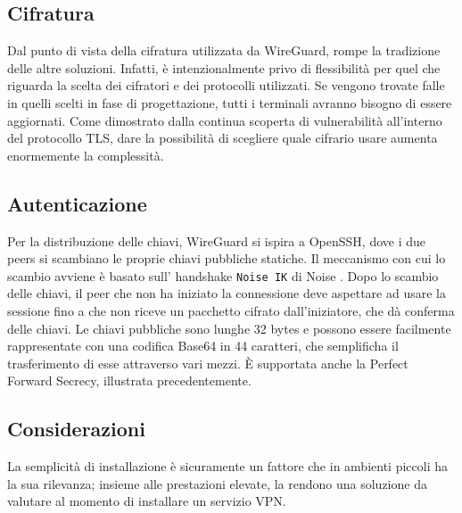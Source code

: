 \subsection{Cifratura}
Dal punto di vista della cifratura utilizzata da WireGuard, rompe la tradizione delle altre soluzioni. Infatti, è intenzionalmente privo di flessibilità per quel che riguarda la scelta dei cifratori e dei protocolli utilizzati. Se vengono trovate falle in quelli scelti in fase di progettazione, tutti i terminali avranno bisogno di essere aggiornati. Come dimostrato dalla continua scoperta di vulnerabilità all'interno del protocollo TLS, dare la possibilità di scegliere quale cifrario usare aumenta enormemente la complessità.

\subsection{Autenticazione}
Per la distribuzione delle chiavi, WireGuard si ispira a OpenSSH, dove i due peers si scambiano le proprie chiavi pubbliche statiche. Il meccanismo con cui lo scambio avviene è basato sull' handshake \texttt{Noise IK} di Noise \cite{Noise}. Dopo lo scambio delle chiavi, il peer che non ha iniziato la connessione deve aspettare ad usare la sessione fino a che non riceve un pacchetto cifrato dall'iniziatore, che dà conferma delle chiavi.
Le chiavi pubbliche sono lunghe 32 bytes e possono essere facilmente rappresentate con una codifica Base64 in 44 caratteri, che semplificha il trasferimento di esse attraverso vari mezzi. È supportata anche la Perfect Forward Secrecy, illustrata precedentemente.

\subsection{Considerazioni}
La semplicità di installazione è sicuramente un fattore che in ambienti piccoli ha la sua rilevanza; insieme alle prestazioni elevate, la rendono una soluzione da valutare al momento di installare un servizio VPN. 